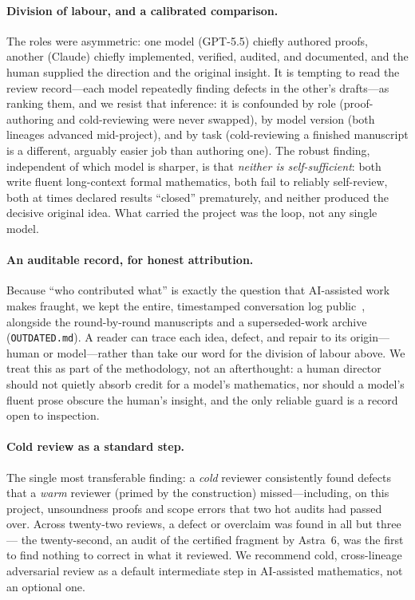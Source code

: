 \documentclass[11pt]{article}
\theoremstyle{plain}
\theoremstyle{definition}
\begin{document}
\paragraph{Division of labour, and a calibrated comparison.} The roles
were asymmetric: one model (GPT-5.5) chiefly authored proofs, another
(Claude) chiefly implemented, verified, audited, and documented, and the
human supplied the direction and the original insight. It is tempting to
read the review record---each model repeatedly finding defects in the
other's drafts---as ranking them, and we resist that inference: it is
confounded by role (proof-authoring and cold-reviewing were never
swapped), by model version (both lineages advanced mid-project), and by
task (cold-reviewing a finished manuscript is a different, arguably easier
job than authoring one). The robust finding, independent of which model is
sharper, is that \emph{neither is self-sufficient}: both write fluent
long-context formal mathematics, both fail to reliably self-review, both
at times declared results ``closed'' prematurely, and neither produced the
decisive original idea. What carried the project was the loop, not any
single model.

\paragraph{An auditable record, for honest attribution.} Because ``who
contributed what'' is exactly the question that AI-assisted work makes
fraught, we kept the entire, timestamped conversation log
public~\cite{ConversationLog}, alongside the round-by-round manuscripts and
a superseded-work archive (\texttt{OUTDATED.md}). A reader can trace each
idea, defect, and repair to its origin---human or model---rather than take
our word for the division of labour above. We treat this as part of the
methodology, not an afterthought: a human director should not quietly
absorb credit for a model's mathematics, nor should a model's fluent prose
obscure the human's insight, and the only reliable guard is a record open
to inspection.

\paragraph{Cold review as a standard step.} The single most transferable
finding: a \emph{cold} reviewer consistently found defects that a
\emph{warm} reviewer (primed by the construction) missed---including, on
this project, unsoundness proofs and scope errors that two hot audits had
passed over. Across twenty-two reviews, a defect or overclaim was found in
all but three --- the twenty-second, an audit of the certified fragment by
Astra~6, was the first to find nothing to correct in what it reviewed. We recommend cold, cross-lineage adversarial review as a
default intermediate step in AI-assisted mathematics, not an optional
one.
\end{document}
